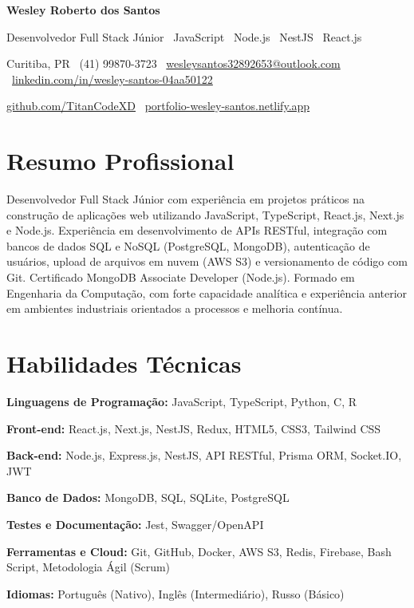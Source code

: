 \documentclass[11pt,a4paper]{article}
\begin{document}
{\LARGE\bfseries\color{headingblue} Wesley Roberto dos Santos}\par
\vspace{2pt}
{\large\color{graytext} Desenvolvedor Full Stack J\'unior \textbar\ JavaScript \textbar\ Node.js \textbar\ NestJS \textbar\ React.js}\par
\vspace{4pt}
\noindent
Curitiba, PR \textbar\ 
(41) 99870-3723 \textbar\ 
\href{mailto:wesleysantos32892653@outlook.com}{wesleysantos32892653@outlook.com} \textbar\ 
\href{https://linkedin.com/in/wesley-santos-04aa50122}{linkedin.com/in/wesley-santos-04aa50122}\par
\noindent
\href{https://github.com/TitanCodeXD}{github.com/TitanCodeXD} \textbar\ 
\href{https://portfolio-wesley-santos.netlify.app}{portfolio-wesley-santos.netlify.app}

\section{Resumo Profissional}
Desenvolvedor Full Stack J\'unior com experi\^encia em projetos pr\'aticos na constru\c{c}\~ao de aplica\c{c}\~oes web utilizando JavaScript, TypeScript, React.js, Next.js e Node.js. Experi\^encia em desenvolvimento de APIs RESTful, integra\c{c}\~ao com bancos de dados SQL e NoSQL (PostgreSQL, MongoDB), autentica\c{c}\~ao de usu\'arios, upload de arquivos em nuvem (AWS S3) e versionamento de c\'odigo com Git. Certificado MongoDB Associate Developer (Node.js). Formado em Engenharia da Computa\c{c}\~ao, com forte capacidade anal\'itica e experi\^encia anterior em ambientes industriais orientados a processos e melhoria cont\'inua.

\section{Habilidades T\'ecnicas}
\textbf{Linguagens de Programa\c{c}\~ao:} JavaScript, TypeScript, Python, C, R\par
\textbf{Front-end:} React.js, Next.js, NestJS, Redux, HTML5, CSS3, Tailwind CSS\par
\textbf{Back-end:} Node.js, Express.js, NestJS, API RESTful, Prisma ORM, Socket.IO, JWT\par
\textbf{Banco de Dados:} MongoDB, SQL, SQLite, PostgreSQL\par
\textbf{Testes e Documentação:} Jest, Swagger/OpenAPI\par
\textbf{Ferramentas e Cloud:} Git, GitHub, Docker, AWS S3, Redis, Firebase, Bash Script, Metodologia \'Agil (Scrum)\par
\textbf{Idiomas:} Portugu\^es (Nativo), Ingl\^es (Intermedi\'ario), Russo (B\'asico)
\end{document}
